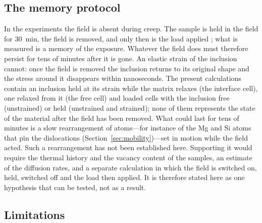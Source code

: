 \subsection{The memory protocol}
\label{sec:memory}

In the experiments the field is absent during creep. The sample is held in the
field for 30~min, the field is removed, and only then is the load applied
\cite{Skvortsov2019PSS,Nikolaev2025SciRep}; what is measured is a memory of
the exposure.
Whatever the field does must therefore persist for tens of minutes after it
is gone. An elastic strain of the inclusion cannot: once the field is removed
the inclusion returns to its original shape and the stress around it
disappears within nanoseconds. The present calculations contain an inclusion held at its strain while the
matrix relaxes (the interface cell), one relaxed from it (the free cell) and
loaded cells with the inclusion free (unstrained) or held (unstrained and strained); none of them represents the
state of the material after the field has been removed. What could last
for tens of minutes is a slow rearrangement of atoms---for instance of the Mg
and Si atoms that pin the dislocations (Section~\ref{sec:mobility})---set in
motion while the field acted. Such a rearrangement has not been established
here. Supporting it would require the thermal history and the vacancy content
of the samples, an estimate of the diffusion rates, and a separate calculation
in which the field is switched on, held, switched off and the load then
applied. It is therefore stated here as one hypothesis that can be tested,
not as a result.

\subsection{Limitations}
\label{sec:limitations}

